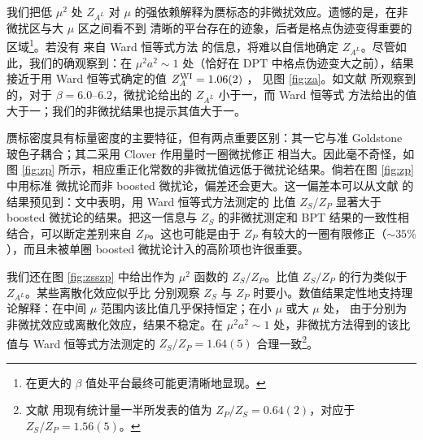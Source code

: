  我们把低 $\mu^2$ 处 $Z_{A^L}$ 对 $\mu$ 的强依赖解释为赝标态的非微扰效应。遗憾的是，在非微扰区与大 $\mu$ 区之间看不到
清晰的平台存在的迹象，后者是格点伪迹变得重要的区域\footnote{在更大的 $\beta$ 值处平台最终可能更清晰地显现。}。若没有
来自 Ward 恒等式方法 \cite{wi} 的信息，将难以自信地确定 $Z_{A^L}$。尽管如此，我们的确观察到：在 $\mu^2 a^2 \sim 1$
处（恰好在 DPT 中格点伪迹变大之前），结果接近于用 Ward 恒等式确定的值 $Z^{{\rm WI}}_A= 1.06(2)$ \cite{wi,gribov}，
见图 \ref{fig:za}。如文献 \cite{wi} 所观察到的，对于 $\beta=6.0$--$6.2$，微扰论给出的 $Z_{A^L}$ 小于一，而 Ward 恒等式
方法给出的值大于一；我们的非微扰结果也提示其值大于一。


赝标密度具有标量密度的主要特征，但有两点重要区别：其一它与准 Goldstone 玻色子耦合；其二采用 Clover 作用量时一圈微扰修正
相当大。因此毫不奇怪，如图 \ref{fig:zp} 所示，相应重正化常数的非微扰值远低于微扰论结果。倘若在图 \ref{fig:zp} 中用标准
微扰论而非 boosted 微扰论，偏差还会更大。这一偏差本可以从文献 \cite{wi} 的结果预见到：文中表明，用 Ward 恒等式方法测定的
比值 $Z_S/Z_P$ 显著大于 boosted 微扰论的结果。把这一信息与 $Z_S$ 的非微扰测定和 BPT 结果的一致性相结合，可以断定差别来自
$Z_P$。这也可能是由于 $Z_P$ 有较大的一圈有限修正（$\sim 35 \%$），而且未被单圈 boosted 微扰论计入的高阶项也许很重要。

我们还在图 \ref{fig:zsszp} 中给出作为 $\mu^2$ 函数的 $Z_S/Z_P$。比值 $Z_S/Z_P$ 的行为类似于 $Z_{A^L}$。某些离散化效应似乎比
分别观察 $Z_S$ 与 $Z_P$ 时要小。数值结果定性地支持理论解释：在中间 $\mu$ 范围内该比值几乎保持恒定；在小 $\mu$ 或大 $\mu$ 处，
由于分别为非微扰效应或离散化效应，结果不稳定。在 $\mu^2 a^2 \sim 1 $ 处，非微扰方法得到的该比值与 Ward 恒等式方法测定的
$Z_S/Z_P=1.64(5)$ \cite{wi} 合理一致\footnote{文献 \cite{wi} 用现有统计量一半所发表的值为 $Z_P/Z_S=0.64(2)$，对应于
$Z_S/Z_P=1.56(5)$。}。
